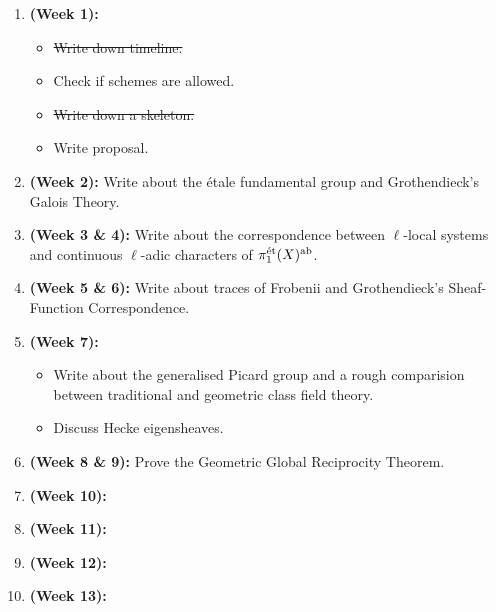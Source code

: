 	\begin{enumerate}
	    \item \textbf{(Week 1):} 
	        \begin{itemize}
	            \item \st{Write down timeline.}
	            \item Check if schemes are allowed.
	            \item \st{Write down a skeleton.}
	            \item Write proposal.
	        \end{itemize}
	    \item \textbf{(Week 2):} Write about the \'etale fundamental group and Grothendieck's Galois Theory.
	    \item \textbf{(Week 3 \& 4):} Write about the correspondence between $\ell$-local systems and continuous $\ell$-adic characters of $\pi_1^{\mathrm{\acute{e}t}}(X)^{\mathrm{ab}}$. 
	    \item \textbf{(Week 5 \& 6):} Write about traces of Frobenii and Grothendieck's Sheaf-Function Correspondence.
	    \item \textbf{(Week 7):}
	        \begin{itemize}
	            \item Write about the generalised Picard group and a rough comparision between traditional and geometric class field theory.
	            \item Discuss Hecke eigensheaves.
	        \end{itemize}
	    \item \textbf{(Week 8 \& 9):} Prove the Geometric Global Reciprocity Theorem.
	    \item \textbf{(Week 10):}
	    \item \textbf{(Week 11):}
	    \item \textbf{(Week 12):}
	    \item \textbf{(Week 13):}
	\end{enumerate}
	

